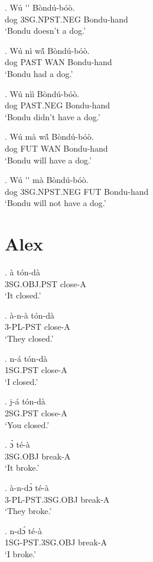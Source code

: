 \documentclass{assets/fieldnotes}
\begin{document}
\exg. W\'{u} \'{}\'{} B\`{o}nd\'{u}-b\'{o}\`{o}. \\ 
dog 3SG.NPST.NEG Bondu-hand \\
`Bondu doesn't a dog.' 

\exg. W\'{u} n\`{i} wã́ B\`{o}nd\'{u}-b\'{o}\`{o}. \\ 
dog PAST WAN Bondu-hand \\
`Bondu had a dog.'  

\exg. W\'{u} n\`{i}\`{i} B\`{o}nd\'{u}-b\'{o}\`{o}. \\ 
dog PAST.NEG Bondu-hand \\
`Bondu didn't have a dog.'  

\exg. W\'{u} m\`{a} wã́ B\`{o}nd\'{u}-b\'{o}\`{o}. \\ 
dog FUT WAN Bondu-hand \\
`Bondu will have a dog.'  

\exg. W\'{u} \'{}\'{} m\`{a} B\`{o}nd\'{u}-b\'{o}\`{o}. \\ 
dog 3SG.NPST.NEG FUT Bondu-hand \\
`Bondu will not have a dog.'  


\section{Alex}


\exg.
à             tón-dà  \\
3SG.OBJ.PST   close-A \\%
`It closed.'

\exg.
à-n-à           tón-dà  \\
3-PL-PST   close-A \\%
`They closed.'

\exg.
n-á            tón-dà  \\
1SG.PST   close-A \\%
`I closed.'

\exg.
j-á            tón-dà  \\
2SG.PST   close-A \\%
`You closed.'

\exg.
ɔ̀             té-à    \\
3SG.OBJ  break-A \\%
`It broke.'

\exg.
à-n-dɔ̀          té-à    \\
3-PL-PST.3SG.OBJ   break-A \\%
`They broke.'

\exg.
n-dɔ́           té-à    \\
1SG-PST.3SG.OBJ  break-A \\%
`I broke.'
\end{document}
